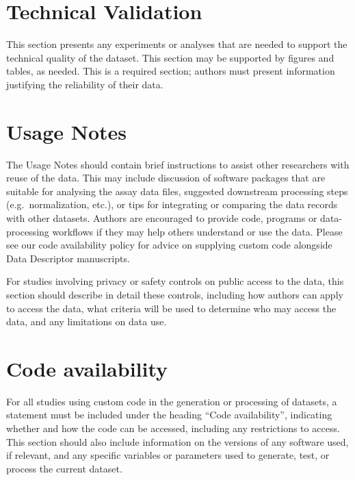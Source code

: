\documentclass[fleqn,10pt]{wlscirep}
\begin{document}
\hypertarget{technical-validation}{%
\section{Technical Validation}\label{technical-validation}}

This section presents any experiments or analyses that are needed to
support the technical quality of the dataset. This section may be
supported by figures and tables, as needed. This is a required section;
authors must present information justifying the reliability of their
data.

\hypertarget{usage-notes}{%
\section{Usage Notes}\label{usage-notes}}

The Usage Notes should contain brief instructions to assist other
researchers with reuse of the data. This may include discussion of
software packages that are suitable for analysing the assay data files,
suggested downstream processing steps (e.g.~normalization, etc.), or
tips for integrating or comparing the data records with other datasets.
Authors are encouraged to provide code, programs or data-processing
workflows if they may help others understand or use the data. Please see
our code availability policy for advice on supplying custom code
alongside Data Descriptor manuscripts.

For studies involving privacy or safety controls on public access to the
data, this section should describe in detail these controls, including
how authors can apply to access the data, what criteria will be used to
determine who may access the data, and any limitations on data use.

\hypertarget{code-availability}{%
\section{Code availability}\label{code-availability}}

For all studies using custom code in the generation or processing of
datasets, a statement must be included under the heading ``Code
availability'', indicating whether and how the code can be accessed,
including any restrictions to access. This section should also include
information on the versions of any software used, if relevant, and any
specific variables or parameters used to generate, test, or process the
current dataset.
\end{document}
